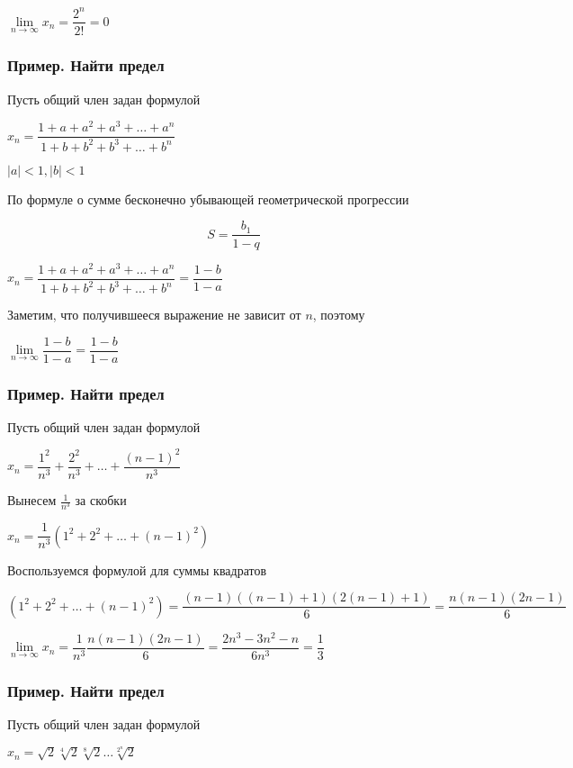 $ \lim\limits_{n \to \infty} x_{n} = \dfrac{2^{n}}{2!} = 0 $

\subsubsection{Пример. Найти предел}


Пусть общий член задан формулой

$ x_{n} = \dfrac{1 + a + a^{2} + a^{3} + \ldots + a^{n}}{1 + b + b^{2} + b^{3} + \ldots + b^{n}}$

$ |a| < 1, |b| < 1 $

По формуле о сумме бесконечно убывающей геометрической прогрессии

$$
S = \dfrac{b_{1}}{1 - q}
$$

$ x_{n} = \dfrac{1 + a + a^{2} + a^{3} + \ldots + a^{n}}{1 + b + b^{2} + b^{3} + \ldots + b^{n}}
= \dfrac{1 - b}{1 - a}
$

Заметим, что получившееся выражение не зависит от $ n $, поэтому

$ \lim\limits_{n \to \infty}  \dfrac{1 - b}{1 - a} =  \dfrac{1 - b}{1 - a} $


\subsubsection{Пример. Найти предел}

Пусть общий член задан формулой

$ x_{n} = \dfrac{1^{2}}{n^{3}} + 
\dfrac{2^{2}}{n^{3}} + 
\ldots +
\dfrac{(n-1)^{2}}{n^{3}}
 $

Вынесем $ \frac{1}{n^{3}} $ за скобки

$ x_{n} = \dfrac{1}{n^{3}} (1^{2} + 2^{2} + \ldots + (n-1)^{2}) $

Воспользуемся формулой для суммы квадратов

$ (1^{2} + 2^{2} + \ldots + (n-1)^{2}) = 
\dfrac{(n - 1)((n - 1) + 1)(2(n-1) + 1)}{6} = 
\dfrac{n(n - 1)(2n -1)}{6}
$

$ \lim\limits_{n \to \infty} x_{n} = \dfrac{1}{n^{3}} \dfrac{n(n - 1)(2n -1)}{6}
= \dfrac{2n^{3}-3n^{2}-n}{6n^{3}} = \dfrac{1}{3}
$


\subsubsection{Пример. Найти предел}

Пусть общий член задан формулой

$ x_{n} = \sqrt{2} \sqrt[4]{2} \sqrt[8]{2} \ldots \sqrt[2^{n}]{2} $

